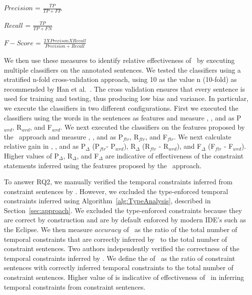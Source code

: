 \begin{center}

$Precision$ = $\frac{TP}{TP + FP}$

$Recall$ = $\frac{TP}{TP + FN}$

$F-Score$ = $\frac{2 X Precison X Recall}{Precision + Recall}$
\end{center}

We then use these measures to identify relative effectiveness of \tool\ by executing multiple classifiers on the annotated sentences.
We tested the classifiers using a stratified n-fold cross-validation approach,
using 10 as the value n (10-fold) as recommended by Han et al.~\cite{han2006data}.
The cross validation ensures that every sentence is used for training and testing,
thus producing low bias and variance.
In particular, we execute the classifiers in two different configurations.
First we executed the classifiers using the words in the sentences as features and measure , , and  as P$_{wrd}$, R$_{wrd}$, and F$_{wrd}$.
We next executed the classifiers on the features proposed by the \tool\ approach and measure , , and  as P$_{ftr}$, R$_{ftr}$, and F$_{ftr}$.
We next calculate relative gain in , , and  as P$_{\Delta}$ (P$_{ftr}$- P$_{wrd}$), R$_{\Delta}$ (R$_{ftr}$ - R$_{wrd}$), and F$_{\Delta}$ (F$_{ftr}$ - F$_{wrd}$). 
Higher values of P$_{\Delta}$, R$_{\Delta}$, and F$_{\Delta}$ are indicative of effectiveness of the constraint statements inferred using the features proposed by the \tool\ approach.


To answer RQ2, we manually verified the temporal constraints inferred from constraint sentences by \tool.
However, we excluded the type-enforced temporal constraints inferred using Algorithm~\ref{alg:TypeAnalysis}, described in Section~\ref{sec:approach}.
We excluded the type-enforced constraints because they are correct by construction and are by default enforced by modern IDE's such as the Eclipse. 
We then measure $accuracy$ of \tool\ as the ratio of the total number of temporal constraints that
are correctly inferred by \tool\ to the total number of constraint sentences. Two authors
independently verified the correctness of the temporal constraints inferred by \tool.
We define the  of \tool\ as the ratio of constraint sentences with correctly inferred temporal constraints
to the total number of constraint sentences. 
Higher value of  is indicative of effectiveness of \tool\ in inferring temporal constraints from constraint sentences.


